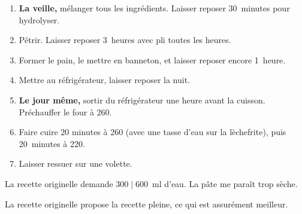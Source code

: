 
\begin{ingredientss}
\end{ingredientss}


\begin{recipe}
  \begin{enumerate}

  \item \textbf{La veille,} mélanger tous les ingrédients.  Laisser
    reposer 30~minutes pour hydrolyser.
    
  \item Pétrir.  Laisser reposer 3~heures avec pli toutes les heures.
    
  \item Former le pain, le mettre en banneton, et laisser reposer
    encore 1~heure.

  \item Mettre au réfrigérateur, laisser reposer la nuit.
    
  \item \textbf{Le jour même,} sortir du réfrigérateur une heure avant
    la cuisson.  Préchauffer le four à 260\degreeC.

  \item Faire cuire 20 minutes à 260\degreeC{} (avec une tasse d'eau sur
    la lèchefrite), puis 20~minutes à 220\degreeC.
    
  \item Laisser ressuer sur une volette.

  \end{enumerate}
\end{recipe}


La recette originelle demande $300\mid 600$~ml d'eau.  La pâte me paraît trop
sèche.

La recette originelle propose la recette pleine, ce qui est assurément
meilleur.

